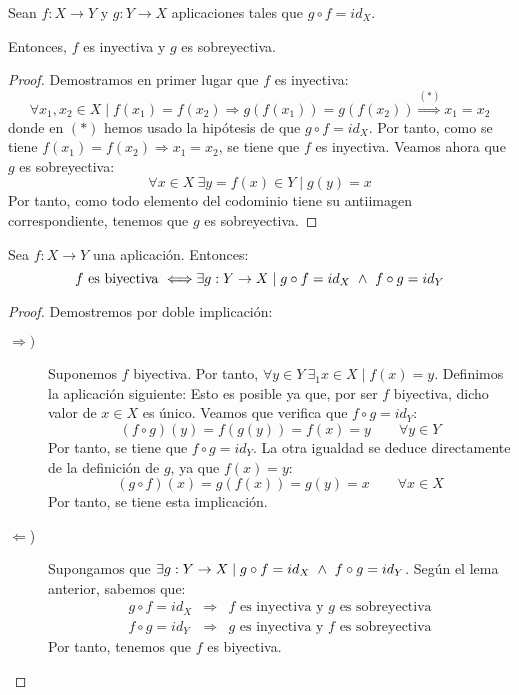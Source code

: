 \begin{lema}
    Sean $f:X\rightarrow Y$ y $g:Y \rightarrow X$ aplicaciones tales que $g \circ f = id_X$.
    
    Entonces, $f$ es inyectiva y $g$ es sobreyectiva.
\end{lema}
\begin{proof}
    Demostramos en primer lugar que $f$ es inyectiva:
    $$\forall x_1, x_2 \in X \mid f(x_1) = f(x_2) \Longrightarrow g(f(x_1)) = g(f(x_2)) \stackrel{(\ast)}{\Longrightarrow} x_1 = x_2$$
    donde en $(\ast)$ hemos usado la hipótesis de que $g \circ f = id_X$.
    Por tanto, como se tiene $f(x_1)=f(x_2)\Longrightarrow x_1=x_2$, se tiene que $f$ es inyectiva. Veamos ahora que $g$ es sobreyectiva:
    $$\forall x \in X ~ \exists y=f(x) \in Y \mid g(y) = x$$
    Por tanto, como todo elemento del codominio tiene su antiimagen correspondiente, tenemos que $g$ es sobreyectiva.
\end{proof}

\begin{teo} \label{teo:CarBiyect}
    Sea $f:X \rightarrow Y$ una aplicación. Entonces:
    $$f \mbox{ es biyectiva } \Longleftrightarrow \exists g:Y \rightarrow X \mid g \circ f = id_X \ \land \  f \circ g = id_Y$$
\end{teo}
\begin{proof} Demostremos por doble implicación:
    \begin{description}
        \item[$\Longrightarrow)$] Suponemos $f$ biyectiva. Por tanto, $\forall y \in Y~\exists_1 x \in X \mid f(x) = y$. Definimos la aplicación siguiente:
        Esto es posible ya que, por ser $f$ biyectiva, dicho valor de $x\in X$ es único. Veamos que verifica que $f\circ g=id_Y$:
        \begin{equation*}
            (f \circ g)(y) = f(g(y)) = f(x) = y \qquad \forall y \in Y
        \end{equation*}
        Por tanto, se tiene que $f \circ g = id_Y$. 
        La otra igualdad se deduce directamente de la definición de $g$, ya que $f(x)=y$:
        \begin{equation*}
            (g\circ f)(x) = g(f(x)) = g(y) = x \qquad \forall x\in X
        \end{equation*}
        Por tanto, se tiene esta implicación.

        \item[$\Longleftarrow$)]  Supongamos que $\exists g:Y \rightarrow X \mid g \circ f = id_X \ \land \  f \circ g = id_Y$.
        Según el lema anterior, sabemos que:
            $$\left.\begin{array}{lll}
                g \circ f = id_X & \Rightarrow & f \mbox{ es inyectiva y } g \mbox{ es sobreyectiva} \\
                f \circ g = id_Y & \Rightarrow & g \mbox{ es inyectiva y } f \mbox{ es sobreyectiva}
            \end{array} \right.$$
        Por tanto, tenemos que $f$ es biyectiva.
    \end{description}
\end{proof}


